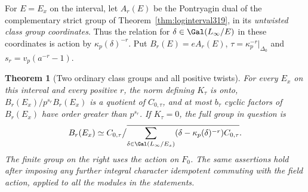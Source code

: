 \documentclass[a4paper,11pt]{article}
\newtheorem{theorem}[proposition]{Theorem}
\theoremstyle{definition}
\theoremstyle{remark}
\numberwithin{equation}{section}
\begin{document}
For \(E=E_x\) on the interval, let \(A_r(E)\) be the Pontryagin
dual of the complementary strict group of Theorem~\ref{thm:loginterval319},
in its \emph{untwisted class group coordinates}. Thus the relation
for \(\delta\in\Gal(L_\infty/E)\) in these coordinates is action by
\(\kappa_p(\delta)^{-r}\). Put \(B_r(E)=eA_r(E)\),
\(\tau=\kappa_p^{-r}|_{\Delta_0}\) and \(s_r=v_p(a^{-r}-1)\).

\begin{theorem}[Two ordinary class groups and all positive twists]\leavevmode
\label{thm:twolayers327}
For every \(E_x\) on this interval and every positive \(r\),
the norm defining \(K_\tau\) is onto, \(B_r(E_x)/p^{s_r}B_r(E_x)\)
is a quotient of \(C_{0,\tau}\), and at most \(b_\tau\) cyclic
factors of \(B_r(E_x)\) have order greater than \(p^{s_r}\).
If \(K_\tau=0\), the full group in question is
\[
 B_r(E_x)\simeq
 C_{0,\tau}\big/
 \overline{\sum_{\delta\in\Gal(L_\infty/E_x)}
      (\delta-\kappa_p(\delta)^{-r})C_{0,\tau}} .
\]
The finite group on the right uses the action on \(F_0\).
The same assertions hold after imposing any further integral
character idempotent commuting with the field action, applied
to all the modules in the statements.
\end{theorem}
\end{document}
